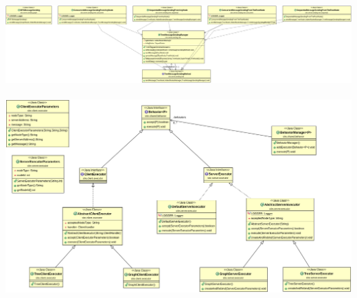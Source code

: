 \newpage
\includegraphics[width=\textwidth]{../uml/sending.png}
\\~\\
\includegraphics[width=\textwidth]{../uml/behavior.png}

